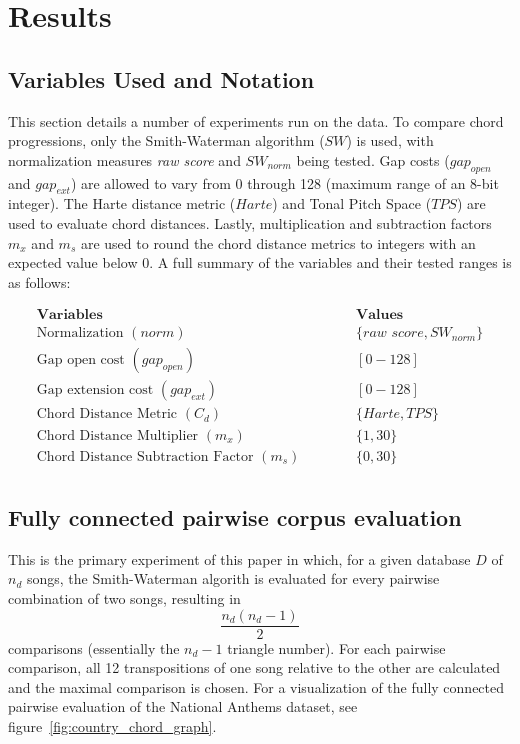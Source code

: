 \chapter{Results}

\section{Variables Used and Notation}

This section details a number of experiments run on the data. To compare chord progressions, only the Smith-Waterman algorithm ($SW$) is used, with normalization measures \textit{raw score} and ${SW}_{norm}$ being tested. Gap costs (${gap}_{open}$ and ${gap}_{ext}$) are allowed to vary from 0 through 128 (maximum range of an 8-bit integer). The Harte distance metric ($Harte$) and Tonal Pitch Space ($TPS$) are used to evaluate chord distances. Lastly, multiplication and subtraction factors $m_x$ and $m_s$ are used to round the chord distance metrics to integers with an expected value below 0. A full summary of the variables and their tested ranges is as follows:

\begin{align*}
\textbf{Variables}                       & \hspace{1cm} & \textbf{Values} \\
\text{Normalization } (norm)                    && \{\textit{raw score},{SW}_{norm}\} \\
\text{Gap open cost } ({gap}_{open})                    && [0-128] \\
\text{Gap extension cost } ({gap}_{ext})                && [0-128] \\
\text{Chord Distance Metric } (C_d)            && \{Harte, TPS\} \\
\text{Chord Distance Multiplier } (m_x)       && \{1, 30\} \\
\text{Chord Distance Subtraction Factor } (m_s) && \{0, 30\} \\
\end{align*}

\section{Fully connected pairwise corpus evaluation}

This is the primary experiment of this paper in which, for a given database $D$ of $n_d$ songs, the Smith-Waterman algorith is evaluated for every pairwise combination of two songs, resulting in \[ \frac{n_d (n_d - 1)}{2} \] comparisons (essentially the $n_d - 1$ triangle number). For each pairwise comparison, all 12 transpositions of one song relative to the other are calculated and the maximal comparison is chosen. For a visualization of the fully connected pairwise evaluation of the National Anthems dataset, see figure~\ref{fig:country_chord_graph}.